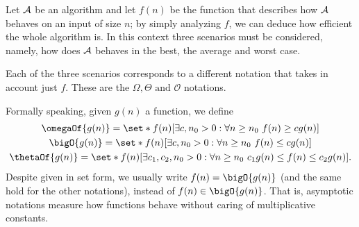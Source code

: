 \documentclass{subfiles}
\begin{document}
    Let \(\mathcal{A}\) be an algorithm and let \(f(n)\) be the function that describes how 
        \(\mathcal{A}\) behaves on an input of size \(n\); by simply analyzing \(f\),
        we can deduce how efficient the whole algorithm is. 
        In this context three scenarios must be considered, namely,
        how does \(\mathcal{A}\) behaves in the best, the average and worst case.
        
    Each of the three scenarios corresponds to a different notation that takes in account 
        just \(f\). These are the \(\Omega, \Theta \text{ and } \mathcal{O}\) notations.

    Formally speaking, given \(g(n)\) a function, we define
    \[\begin{gathered}
        \omegaOf{g(n)} = \set*{f(n)}[\exists c, n_{0} > 0 : \forall n \ge n_{0} \ f(n) \ge cg(n)]\\
        \bigO{g(n)} = \set*{f(n)}[\exists c, n_{0} > 0 : \forall n \ge n_{0} \ f(n) \le cg(n)] \\ 
        \thetaOf{g(n)} = \set*{f(n)}[\exists c_{1}, c_{2}, n_{0} > 0 : \forall n \ge n_{0} \ c_{1}g(n) \le f(n) \le c_{2}g(n)].
    \end{gathered}\]
    Despite given in set form, we usually write \(f(n) = \bigO{g(n)}\) (and the same hold for the other notations),
        instead of \(f(n) \in \bigO{g(n)}\). That is, asymptotic notations measure how 
        functions behave without caring of multiplicative constants.
\end{document}
